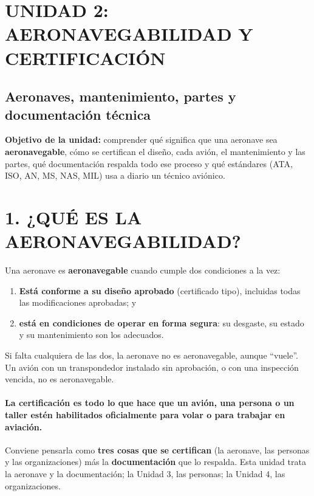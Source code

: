 \clearpage
\section*{UNIDAD 2: AERONAVEGABILIDAD Y CERTIFICACIÓN}
\subsection*{Aeronaves, mantenimiento, partes y documentación técnica}

\begin{recuadro}
\textbf{Objetivo de la unidad:} comprender qué significa que una aeronave sea
\textbf{aeronavegable}, cómo se certifican el diseño, cada avión, el mantenimiento y las partes,
qué documentación respalda todo ese proceso y qué estándares (ATA, ISO, AN, MS, NAS, MIL) usa a
diario un técnico aviónico.
\end{recuadro}

\section*{1. ¿QUÉ ES LA AERONAVEGABILIDAD?}

Una aeronave es \textbf{aeronavegable} cuando cumple dos condiciones a la vez:
\begin{enumerate}
  \item \textbf{Está conforme a su diseño aprobado} (certificado tipo), incluidas todas las
        modificaciones aprobadas; y
  \item \textbf{está en condiciones de operar en forma segura}: su desgaste, su estado y su
        mantenimiento son los adecuados.
\end{enumerate}
Si falta cualquiera de las dos, la aeronave no es aeronavegable, aunque ``vuele''. Un avión con un
transpondedor instalado sin aprobación, o con una inspección vencida, no es aeronavegable.

\paragraph*{La certificación es todo lo que hace que un avión, una persona o un taller estén
habilitados oficialmente para volar o para trabajar en aviación.} Conviene pensarla como
\textbf{tres cosas que se certifican} (la aeronave, las personas y las organizaciones) más la
\textbf{documentación} que lo respalda. Esta unidad trata la aeronave y la documentación; la
Unidad 3, las personas; la Unidad 4, las organizaciones.

